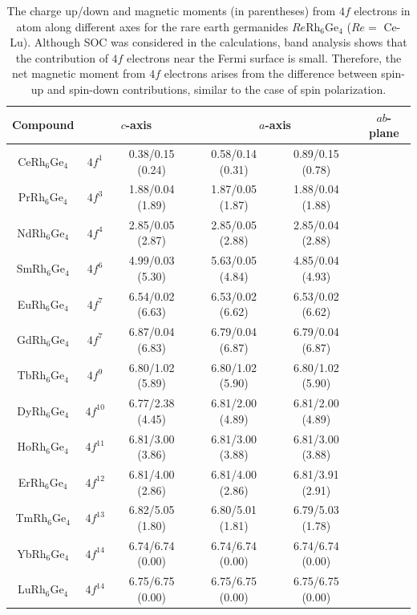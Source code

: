 \documentclass[preprint,12pt]{elsarticle}
\begin{document}
\begin{table}[h]
\caption{The charge up/down and magnetic moments (in parentheses) from $4f$ electrons in atom along different axes for the rare earth germanides $Re$Rh$_6$Ge$_4$ ($Re =$ Ce-Lu). Although SOC was considered in the calculations, band analysis shows that the contribution of $4f$ electrons near the Fermi surface is small. Therefore, the net magnetic moment from $4f$ electrons arises from the difference between spin-up and spin-down contributions, similar to the case of spin polarization.}
\label{tab:4fcharge}
\begin{tabular}{c c c c c c c}
\hline
Compound & \multicolumn{2}{c}{$c$-axis} & \multicolumn{2}{c}{$a$-axis} & \multicolumn{2}{c}{$ab$-plane} \\
\hline
CeRh$_6$Ge$_4$ & $4f^1$ & 0.38/0.15 (0.24) & 0.58/0.14 (0.31) & 0.89/0.15 (0.78) \\
PrRh$_6$Ge$_4$ & $4f^3$ & 1.88/0.04 (1.89) & 1.87/0.05 (1.87) & 1.88/0.04 (1.88) \\
NdRh$_6$Ge$_4$ & $4f^4$ & 2.85/0.05 (2.87) & 2.85/0.05 (2.88) & 2.85/0.04 (2.88) \\
SmRh$_6$Ge$_4$ & $4f^6$ & 4.99/0.03 (5.30) & 5.63/0.05 (4.84) & 4.85/0.04 (4.93) \\
EuRh$_6$Ge$_4$ & $4f^7$ & 6.54/0.02 (6.63) & 6.53/0.02 (6.62) & 6.53/0.02 (6.62) \\
GdRh$_6$Ge$_4$ & $4f^7$ & 6.87/0.04 (6.83) & 6.79/0.04 (6.87) & 6.79/0.04 (6.87) \\
TbRh$_6$Ge$_4$ & $4f^9$ & 6.80/1.02 (5.89) & 6.80/1.02 (5.90) & 6.80/1.02 (5.90) \\
DyRh$_6$Ge$_4$ & $4f^{10}$ & 6.77/2.38 (4.45) & 6.81/2.00 (4.89) & 6.81/2.00 (4.89) \\
HoRh$_6$Ge$_4$ & $4f^{11}$ & 6.81/3.00 (3.86) & 6.81/3.00 (3.88) & 6.81/3.00 (3.88) \\
ErRh$_6$Ge$_4$ & $4f^{12}$ & 6.81/4.00 (2.86) & 6.81/4.00 (2.86) & 6.81/3.91 (2.91) \\
TmRh$_6$Ge$_4$ & $4f^{13}$ & 6.82/5.05 (1.80) & 6.80/5.01 (1.81) & 6.79/5.03 (1.78) \\
YbRh$_6$Ge$_4$ & $4f^{14}$ & 6.74/6.74 (0.00) & 6.74/6.74 (0.00) & 6.74/6.74 (0.00) \\
LuRh$_6$Ge$_4$ & $4f^{14}$ & 6.75/6.75 (0.00) & 6.75/6.75 (0.00) & 6.75/6.75 (0.00) \\
\hline
\end{tabular}
\end{table}
\end{document}
